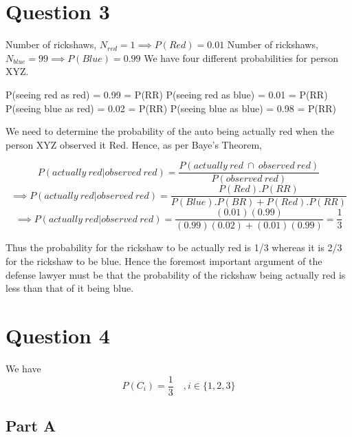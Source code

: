 \documentclass[12pt]{article}
\begin{document}
\section{Question 3}
Number of rickshaws, $N_{red} = 1 \implies P(Red)=0.01$ \newline
Number of rickshaws, $N_{blue} = 99 \implies P(Blue)=0.99$ \newline
We have four different probabilities for person XYZ.
\begin{center}
P(seeing red as red) = 0.99 = P(RR)
\newline P(seeing red as blue) = 0.01 = P(RR)
\newline P(seeing blue as red) = 0.02 = P(RR)
\newline P(seeing blue as blue) = 0.98 = P(RR)\newline 
\end{center}
We need to determine the probability of the auto being actually red when the person XYZ observed it Red. \newline\newline
Hence, as per Baye's Theorem,
\begin{center}
$$P(actually \ red | observed \ red) = \frac{P(actually \ red \ \cap \ observed \ red)}{P(observed \ red)} $$
$$\implies P(actually \ red | observed \ red) = \frac{P(Red).P(RR)}{P(Blue).P(BR) + P(Red).P(RR)} $$
$$\implies P(actually \ red | observed \ red) = \frac{(0.01)(0.99)}{(0.99)(0.02) + (0.01)(0.99)}  = \frac{1}{3}$$
\end{center}
Thus the probability for the rickshaw to be actually red is 1/3 whereas it is 2/3 for the rickshaw to be blue.\newline\newline
Hence the foremost important argument of the defense lawyer must be that the probability of the rickshaw being actually red is less than that of it being blue.


\newpage
\section{Question 4}
We have 
$$P(C_i)=\frac{1}{3} \quad ,i \in \{1,2,3\}$$
\subsection{Part A}




\newpage
\end{document}
